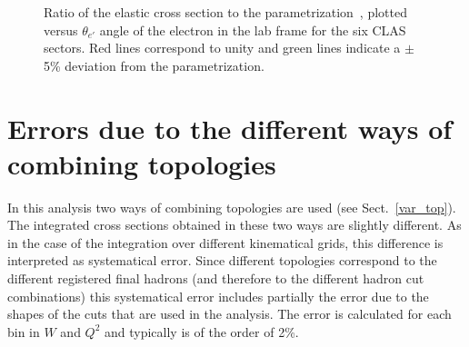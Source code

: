 \begin{figure}[ht]

\begin{center}
\end{center}
\vspace{-0.6cm}
\caption{\small Ratio of the elastic cross
section to the 
parametrization~\cite{Bosted:1994tm},
plotted versus $\theta_{e'}$ angle of the
electron in the lab frame for the six CLAS sectors. Red lines correspond to
unity and green lines indicate a $\pm$5\%
deviation from the parametrization. }
\label{elastcross}
\end{figure}
\newpage

\section{Errors due to the different ways of combining topologies}
\label{var_top_err}

In this analysis two ways of combining topologies are used (see Sect.~\ref{var_top}). The integrated cross sections obtained in these two ways are slightly different. As in the case of the integration over different kinematical grids, this difference is interpreted as systematical error. 
Since different topologies correspond to the different registered final hadrons (and therefore to the different hadron cut combinations) this systematical error includes partially the error due to the shapes of the cuts that are used in the analysis. The error is calculated for each bin in  $W$ and $Q^{2}$ and typically is of the order of 2\%.

